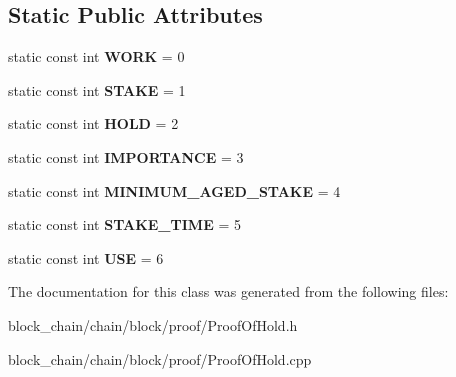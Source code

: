 \subsection*{Static Public Attributes}
\begin{DoxyCompactItemize}
\item 
\mbox{\label{classProof_a457d231986439ee6bcc945daacfc28fc}} 
static const int {\bfseries W\+O\+RK} = 0
\item 
\mbox{\label{classProof_acf157976c3c86ef2fd0e838b8c4ac992}} 
static const int {\bfseries S\+T\+A\+KE} = 1
\item 
\mbox{\label{classProof_ae5c2a86640bf558ff5625157e23b3eec}} 
static const int {\bfseries H\+O\+LD} = 2
\item 
\mbox{\label{classProof_a4e71a5e5928900794353acdd169ca652}} 
static const int {\bfseries I\+M\+P\+O\+R\+T\+A\+N\+CE} = 3
\item 
\mbox{\label{classProof_a1a08ffc465f4fcfde396d4c4feb22eb0}} 
static const int {\bfseries M\+I\+N\+I\+M\+U\+M\+\_\+\+A\+G\+E\+D\+\_\+\+S\+T\+A\+KE} = 4
\item 
\mbox{\label{classProof_a1aa2cb91c5be4ca021714ff6fc01da4a}} 
static const int {\bfseries S\+T\+A\+K\+E\+\_\+\+T\+I\+ME} = 5
\item 
\mbox{\label{classProof_a3f6898fa1d652d32182c3c387c8e979c}} 
static const int {\bfseries U\+SE} = 6
\end{DoxyCompactItemize}


The documentation for this class was generated from the following files\+:\begin{DoxyCompactItemize}
\item 
block\+\_\+chain/chain/block/proof/Proof\+Of\+Hold.\+h\item 
block\+\_\+chain/chain/block/proof/Proof\+Of\+Hold.\+cpp\end{DoxyCompactItemize}

